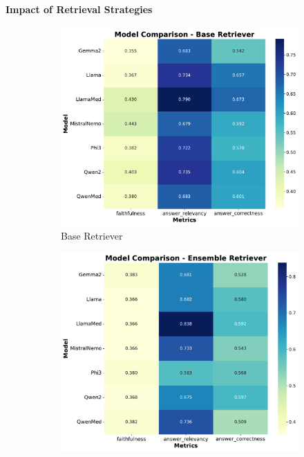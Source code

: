 \paragraph{Impact of Retrieval Strategies}
%
\begin{figure}[h]
  \centering
  \begin{subfigure}{0.49\textwidth}
    \includegraphics[width=\textwidth]{figures/heatmap_Base}
    \caption{Base Retriever}
  \end{subfigure}
  \begin{subfigure}{0.49\textwidth}
    \includegraphics[width=\textwidth]{figures/heatmap_Ensemble}

\end{subfigure}
\end{figure}
